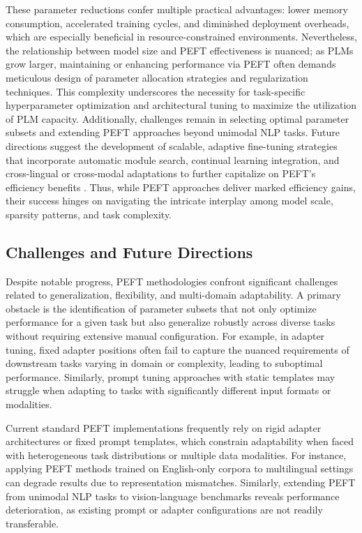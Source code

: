 \documentclass[sigconf]{acmart}
\begin{document}
These parameter reductions confer multiple practical advantages: lower memory consumption, accelerated training cycles, and diminished deployment overheads, which are especially beneficial in resource-constrained environments. Nevertheless, the relationship between model size and PEFT effectiveness is nuanced; as PLMs grow larger, maintaining or enhancing performance via PEFT often demands meticulous design of parameter allocation strategies and regularization techniques. This complexity underscores the necessity for task-specific hyperparameter optimization and architectural tuning to maximize the utilization of PLM capacity. Additionally, challenges remain in selecting optimal parameter subsets and extending PEFT approaches beyond unimodal NLP tasks. Future directions suggest the development of scalable, adaptive fine-tuning strategies that incorporate automatic module search, continual learning integration, and cross-lingual or cross-modal adaptations to further capitalize on PEFT’s efficiency benefits \cite{ref48}. Thus, while PEFT approaches deliver marked efficiency gains, their success hinges on navigating the intricate interplay among model scale, sparsity patterns, and task complexity.

\subsection{Challenges and Future Directions}

Despite notable progress, PEFT methodologies confront significant challenges related to generalization, flexibility, and multi-domain adaptability. A primary obstacle is the identification of parameter subsets that not only optimize performance for a given task but also generalize robustly across diverse tasks without requiring extensive manual configuration. For example, in adapter tuning, fixed adapter positions often fail to capture the nuanced requirements of downstream tasks varying in domain or complexity, leading to suboptimal performance. Similarly, prompt tuning approaches with static templates may struggle when adapting to tasks with significantly different input formats or modalities.

Current standard PEFT implementations frequently rely on rigid adapter architectures or fixed prompt templates, which constrain adaptability when faced with heterogeneous task distributions or multiple data modalities. For instance, applying PEFT methods trained on English-only corpora to multilingual settings can degrade results due to representation mismatches. Similarly, extending PEFT from unimodal NLP tasks to vision-language benchmarks reveals performance deterioration, as existing prompt or adapter configurations are not readily transferable.
\end{document}

